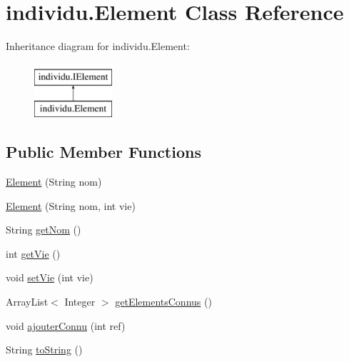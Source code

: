 \hypertarget{classindividu_1_1_element}{\section{individu.\-Element Class Reference}
\label{classindividu_1_1_element}
}
Inheritance diagram for individu.\-Element\-:\begin{figure}[H]
\begin{center}
\leavevmode
\includegraphics[height=2.000000cm]{classindividu_1_1_element}
\end{center}
\end{figure}
\subsection*{Public Member Functions}
\begin{DoxyCompactItemize}
\item 
\hyperlink{classindividu_1_1_element_a5f9423f93dc30636b89b87580f328b69}{Element} (String nom)
\item 
\hyperlink{classindividu_1_1_element_ade1523ec99322a5c39e3becdbfc50ee3}{Element} (String nom, int vie)
\item 
String \hyperlink{classindividu_1_1_element_a2623a37998d1558ad9d9f9352f833cd4}{get\-Nom} ()
\item 
int \hyperlink{classindividu_1_1_element_ab41f49b096712f65285de4437f1b15b5}{get\-Vie} ()
\item 
void \hyperlink{classindividu_1_1_element_ad8c8123352986a7e80dea748e34922cc}{set\-Vie} (int vie)
\item 
Array\-List$<$ Integer $>$ \hyperlink{classindividu_1_1_element_a46430a36f795bf42832317f96fdeeb5e}{get\-Elements\-Connus} ()
\item 
void \hyperlink{classindividu_1_1_element_aaaa713cc814adae8a8dda825263b48db}{ajouter\-Connu} (int ref)
\item 
String \hyperlink{classindividu_1_1_element_af4c2b08d92cfad7532168a5ccd6c2ebb}{to\-String} ()
\end{DoxyCompactItemize}


